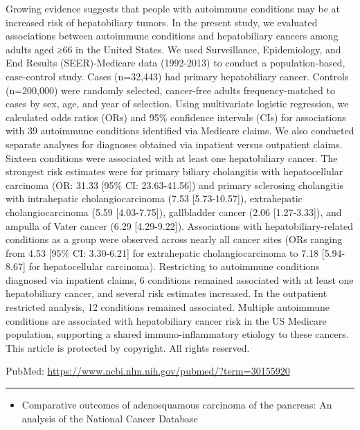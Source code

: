 \documentclass[]{article}
\providecommand{\tightlist}{%
  \setlength{\itemsep}{0pt}\setlength{\parskip}{0pt}}
\begin{document}
Growing evidence suggests that people with autoimmune conditions may be
at increased risk of hepatobiliary tumors. In the present study, we
evaluated associations between autoimmune conditions and hepatobiliary
cancers among adults aged ≥66 in the United States. We used
Surveillance, Epidemiology, and End Results (SEER)-Medicare data
(1992-2013) to conduct a population-based, case-control study. Cases
(n=32,443) had primary hepatobiliary cancer. Controls (n=200,000) were
randomly selected, cancer-free adults frequency-matched to cases by sex,
age, and year of selection. Using multivariate logistic regression, we
calculated odds ratios (ORs) and 95\% confidence intervals (CIs) for
associations with 39 autoimmune conditions identified via Medicare
claims. We also conducted separate analyses for diagnoses obtained via
inpatient versus outpatient claims. Sixteen conditions were associated
with at least one hepatobiliary cancer. The strongest risk estimates
were for primary biliary cholangitis with hepatocellular carcinoma (OR:
31.33 {[}95\% CI: 23.63-41.56{]}) and primary sclerosing cholangitis
with intrahepatic cholangiocarcinoma (7.53 {[}5.73-10.57{]}),
extrahepatic cholangiocarcinoma (5.59 {[}4.03-7.75{]}), gallbladder
cancer (2.06 {[}1.27-3.33{]}), and ampulla of Vater cancer (6.29
{[}4.29-9.22{]}). Associations with hepatobiliary-related conditions as
a group were observed across nearly all cancer sites (ORs ranging from
4.53 {[}95\% CI: 3.30-6.21{]} for extrahepatic cholangiocarcinoma to
7.18 {[}5.94-8.67{]} for hepatocellular carcinoma). Restricting to
autoimmune conditions diagnosed via inpatient claims, 6 conditions
remained associated with at least one hepatobiliary cancer, and several
risk estimates increased. In the outpatient restricted analysis, 12
conditions remained associated. Multiple autoimmune conditions are
associated with hepatobiliary cancer risk in the US Medicare population,
supporting a shared immuno-inflammatory etiology to these cancers. This
article is protected by copyright. All rights reserved.

PubMed: \url{https://www.ncbi.nlm.nih.gov/pubmed/?term=30155920}

{}

{}

\begin{center}\rule{0.5\linewidth}{\linethickness}\end{center}

\begin{itemize}
\tightlist
\item
  Comparative outcomes of adenosquamous carcinoma of the pancreas: An
  analysis of the National Cancer Database
\end{itemize}
\end{document}
